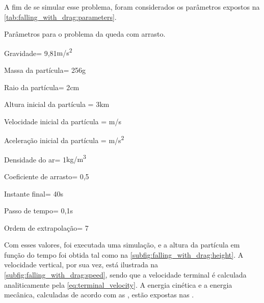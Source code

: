 A fim de se simular esse problema, foram considerados os parâmetros expostos na \cref{tab:falling_with_drag:parameters}. 

\begin{table}[h]
\centering
\caption{Parâmetros para o problema da queda com arrasto.}
\label{tab:falling_with_drag:parameters}
\begin{parametersdesc}{0.8\textwidth}
	\item{Gravidade}{\gravityScalar = 9,81}{\si[per-mode=symbol]{\metre\per\square\second}}
	\hline
	\item{Massa da partícula}{\mass = 256}{\si\gram}
	\item{Raio da partícula}{\radius = 2}{\si\centi\metre}
	\item{Altura inicial da partícula}{\initial{\positiony} = 3}{\si{\kilo\metre}}
	\item{Velocidade inicial da partícula}{\explicitVector{\initial{\velocityx}}{\initial{\velocityy}}{\initial{\velocityz}} = }{\si[per-mode=symbol]{\metre\per\second}}
	\item{Aceleração inicial da partícula}{\explicitVector{\initial{\accelerationx}}{\initial{\accelerationy}}{\initial{\accelerationz}} = }{\si[per-mode=symbol]{\metre\per\square\second}}
	\hline
	\item{Densidade do ar}{\specificMass = 1}{\si[per-mode=symbol]{\kilogram\per\cubic\meter}}
	\item{Coeficiente de arrasto}{\dragCoefficient = 0,5}{\emptyUnit}
	\hline
	\item{Instante final}{\finalInstant = 40}{\si\second} 
	\item{Passo de tempo}{\Dt = 0,1}{\si\second}
	\item{Ordem de extrapolação}{\taylorOrder = 7}{\emptyUnit}
\end{parametersdesc}
\sourceMe 
\end{table}

Com esses valores, foi executada uma simulação, e a altura da partícula em função do tempo foi obtida tal como na \cref{subfig:falling_with_drag:height}. A velocidade vertical, por sua vez, está ilustrada na \cref{subfig:falling_with_drag:speed}, sendo que a velocidade terminal é calculada analiticamente pela \cref{eq:terminal_velocity}. A energia cinética e a energia mecânica, calculadas de acordo com as  , estão expostas nas  .

